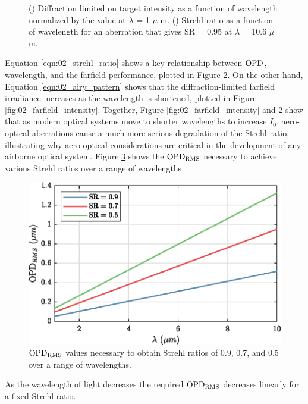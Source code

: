 \begin{figure}
\begin{subfigure}[t]{0.45\textwidth}
    \caption{}\label{fig:02_all_strehl_ratio}
  \end{subfigure}
  \caption{() Diffraction limited on target intensity as a function of wavelength normalized by the value at $\lambda$ = 1 $\mu$ m. () Strehl ratio as a function of wavelength for an aberration that gives SR = 0.95 at $\lambda$ = 10.6 $\mu$m.}
\end{figure}
Equation \ref{eqn:02_strehl_ratio} shows a key relationship between $\operatorname{OPD}$, wavelength, and the farfield performance, plotted in Figure \ref{fig:02_all_strehl_ratio}.
On the other hand, Equation \ref{eqn:02_airy_pattern} shows that the diffraction-limited farfield irradiance increases as the wavelength is shortened, plotted in Figure \ref{fig:02_farfield_intensity}.
Together, Figure \ref{fig:02_farfield_intensity} and \ref{fig:02_all_strehl_ratio} show that as modern optical systems move to shorter wavelengths to increase $I_0$, aero-optical aberrations cause a much more serious degradation of the Strehl ratio, illustrating why aero-optical considerations are critical in the development of any airborne optical system.
Figure \ref{fig:02_necessary_opd} shows the $\operatorname{OPD_{RMS}}$ necessary to achieve various Strehl ratios over a range of wavelengths.
\begin{figure}
  \centering
  \includegraphics{../matlab/02_background/necessary_opd.eps}
  \caption{$\operatorname{OPD_{RMS}}$ values necessary to obtain Strehl ratios of 0.9, 0.7, and 0.5 over a range of wavelengths.}
  \label{fig:02_necessary_opd}
\end{figure}
As the wavelength of light decreases the required $\operatorname{OPD_{RMS}}$ decreases linearly for a fixed Strehl ratio.


